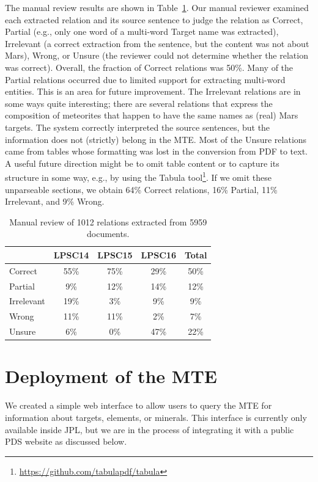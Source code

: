 \documentclass[letterpaper]{article} %
\begin{document}
The manual review results are shown in Table~\ref{tab:large}.  Our
manual reviewer examined each extracted relation and its source
sentence to judge the relation as Correct, Partial (e.g., only one
word of a multi-word Target name was extracted), Irrelevant (a correct
extraction from the sentence, but the content was not about Mars),
Wrong, or Unsure (the reviewer could not determine whether the
relation was correct).
%
Overall, the fraction of Correct relations was 50\%.  Many of the
Partial relations occurred due to limited support for extracting
multi-word entities.  This is an area for future improvement.
The Irrelevant relations are in some ways quite interesting;
there are several relations that express the composition of meteorites
that happen to have the same names as (real) Mars targets.  The system
correctly interpreted the source sentences, but the information does
not (strictly) belong in the MTE.
%
Most of the Unsure relations came from tables whose formatting was
lost in the conversion from PDF to text.  A useful future direction
might be to omit table content or to capture its structure in some
way, e.g., by using the Tabula
tool\footnote{\url{https://github.com/tabulapdf/tabula}}.  If we omit
these unparseable sections, we obtain 64\% Correct 
relations, 16\% Partial, 11\% Irrelevant, and 9\% Wrong.

\begin{table}
\caption{Manual review of 1012 relations extracted from 5959 documents.} 
\label{tab:large}
\begin{center}
\begin{tabular}{l|ccc|c}
        & LPSC14 & LPSC15 & LPSC16 & Total \\ \hline
Correct    & 55\% & 75\% & 29\% & 50\% \\ \hline
Partial    &  9\% & 12\% & 14\% & 12\% \\
Irrelevant & 19\% &  3\% &  9\% &  9\% \\
Wrong      & 11\% & 11\% &  2\% &  7\% \\
Unsure     &  6\% &  0\% & 47\% & 22\% \\
\hline
\end{tabular}
\end{center}
\end{table}

\section{Deployment of the MTE}

We created a simple web interface to allow users to query the MTE for
information about targets, elements, or minerals.  This interface is
currently only available inside JPL, but we are in the process of
integrating it with a public PDS website as discussed below.
\end{document}
